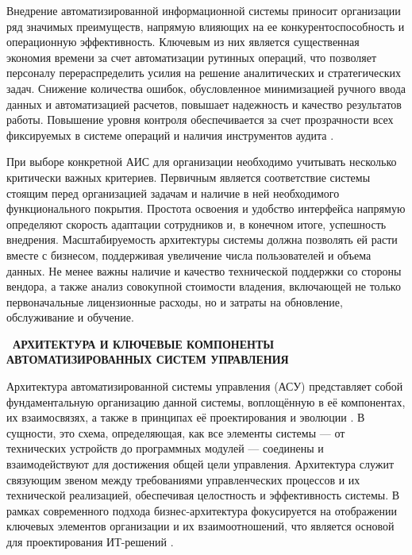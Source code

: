 \documentclass{SibFU-docs}
\begin{document}

Внедрение автоматизированной информационной системы приносит организации ряд значимых преимуществ, напрямую влияющих на ее конкурентоспособность и операционную эффективность. Ключевым из них является существенная экономия времени за счет автоматизации рутинных операций, что позволяет персоналу перераспределить усилия на решение аналитических и стратегических задач. Снижение количества ошибок, обусловленное минимизацией ручного ввода данных и автоматизацией расчетов, повышает надежность и качество результатов работы. Повышение уровня контроля обеспечивается за счет прозрачности всех фиксируемых в системе операций и наличия инструментов аудита \cite{ais_efficiency}.

При выборе конкретной АИС для организации необходимо учитывать несколько критически важных критериев. Первичным является соответствие системы стоящим перед организацией задачам и наличие в ней необходимого функционального покрытия. Простота освоения и удобство интерфейса напрямую определяют скорость адаптации сотрудников и, в конечном итоге, успешность внедрения. Масштабируемость архитектуры системы должна позволять ей расти вместе с бизнесом, поддерживая увеличение числа пользователей и объема данных. Не менее важны наличие и качество технической поддержки со стороны вендора, а также анализ совокупной стоимости владения, включающей не только первоначальные лицензионные расходы, но и затраты на обновление, обслуживание и обучение.

\newpage
{}
\begin{center}\textbf{\thesection\ АРХИТЕКТУРА И КЛЮЧЕВЫЕ КОМПОНЕНТЫ АВТОМАТИЗИРОВАННЫХ СИСТЕМ УПРАВЛЕНИЯ}\end{center}
\vspace*{-1.5em}

Архитектура автоматизированной системы управления (АСУ) представляет собой фундаментальную организацию данной системы, воплощённую в её компонентах, их взаимосвязях, а также в принципах её проектирования и эволюции \cite{gosstandart}. В сущности, это схема, определяющая, как все элементы системы — от технических устройств до программных модулей — соединены и взаимодействуют для достижения общей цели управления. Архитектура служит связующим звеном между требованиями управленческих процессов и их технической реализацией, обеспечивая целостность и эффективность системы. В рамках современного подхода бизнес-архитектура фокусируется на отображении ключевых элементов организации и их взаимоотношений, что является основой для проектирования ИТ-решений \cite{iiba_components}.
\end{document}
